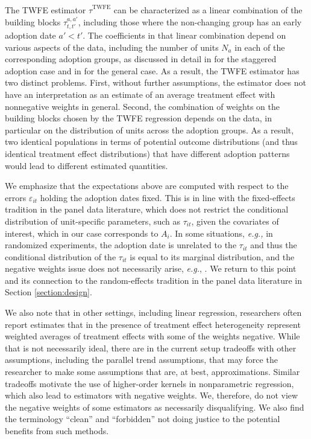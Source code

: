 \documentclass[letterpaper,12pt,leqno]{article}
\newcommand{\twfe}{\mathrm{TWFE}}
\newcommand{\htautwfe}{\hat\tau^{\twfe}}
\begin{document}
The TWFE estimator $\htautwfe$  can be characterized as a linear combination of the building blocks $\hat\tau_{t,t'}^{a,a'}$, including those where the non-changing group has an early adoption date $a'<t'$. The coefficients in that linear combination depend on various aspects of the data, including the number of units $N_a$ in each of the corresponding adoption groups, as discussed in detail in \citep{goodman2021difference,
baker2021much} for the staggered adoption case and in \citep*{imai2021use} for the general case. As a result, the TWFE estimator has two distinct problems. First, without further assumptions, the estimator does not have an interpretation as an estimate of an average treatment effect with nonnegative weights in general. Second, the combination of weights on the building blocks chosen by the TWFE regression depends on the data, in particular on the distribution of units across the adoption groups. As a result, two identical populations in terms of potential outcome distributions (and thus identical treatment effect distributions) that have different adoption patterns would lead to different estimated quantities. 

We emphasize that the expectations above are computed with respect to the errors $\varepsilon_{it}$ holding the adoption dates fixed. This is in line with the fixed-effects tradition in the panel data literature, which does not restrict the conditional distribution of unit-specific parameters, such as $\tau_{it}$, given the covariates of interest, which in our case corresponds to $A_{i}$. In some situations, {\it e.g.,} in randomized experiments, the adoption date is unrelated to the $\tau_{it}$ and thus the conditional distribution of the $\tau_{it}$ is equal to its marginal distribution,
 and the negative weights issue does not necessarily arise, {\it e.g.}, \citep{lihua2021}. We return to this point and its connection to the random-effects tradition in the panel data literature in Section \ref{section:design}.

We also note that in other settings, including linear regression, researchers often report estimates that in the presence of treatment effect heterogeneity represent weighted averages of treatment effects with some of the weights negative. While that is not necessarily ideal, there are in the current setup tradeoffs with other assumptions, including the parallel trend assumptions, that may force the researcher to make some assumptions that are, at best, approximations. Similar tradeoffs motivate the use of higher-order kernels in nonparametric regression, which also lead to estimators with negative weights. We, therefore, do not view the negative weights of some estimators as necessarily disqualifying. We also find the terminology ``clean'' and ``forbidden'' not doing justice to the potential benefits from such methods. 
\end{document}
